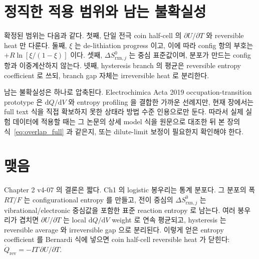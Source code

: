 \documentclass[11pt,a4paper]{article}
\newcommand{\dd}{\mathrm{d}}
\newcommand{\rxn}{\mathrm{rxn}}
\newcommand{\rev}{\mathrm{rev}}
\begin{document}
\section{정직한 적용 범위와 남는 불확실성}
\label{sec:scope}
확정된 범위는 다음과 같다. 첫째, 단일 전극 coin half-cell 의 $\partial U/\partial T$ 와
reversible heat 만 다룬다. 둘째, $\xi$ 는 de-lithiation progress 이고, 이에 따라 config 항의 부호는
$+R\ln[\xi/(1-\xi)]$ 이다. 셋째, $\Delta S_{\rxn,j}^0$ 는 중심 표준값이며, 분포가 만드는 config 항과
이중계산하지 않는다. 넷째, hysteresis branch 의 평균은 reversible entropy coefficient 로 쓰되,
branch gap 자체는 irreversible heat 로 분리한다.

남는 불확실성은 하나로 압축된다. Electrochimica Acta 2019 occupation-transition prototype 은
$\dd Q/\dd V$ 와 entropy profiling 을 결합한 가까운 선례지만, 현재 장에서는 full text 식을 직접 확보하지
못한 상태라 방법 수준 인용으로만 둔다. 따라서 실제 실험 데이터에 적용할 때는 그 논문의 상세 model 식을
원문으로 대조한 뒤 본 장의 식~\eqref{eq:overlap_full} 과 같은지, 또는 dilute-limit 보정이 필요한지
확인해야 한다.

\section*{맺음}
Chapter 2 v4-07 의 결론은 짧다. Ch1 의 logistic 봉우리는 통계 분포다. 그 분포의 폭 $RT/F$ 는
configurational entropy 를 만들고, 전이 중심의 $\Delta S_{\rxn,j}^0$ 는 vibrational/electronic 중심값을
포함한 표준 reaction entropy 로 남는다. 여러 봉우리가 겹치면 $\partial U/\partial T$ 는 local
$\dd Q/\dd V$ weight 로 연속 평균되고, hysteresis 는 reversible average 와 irreversible gap 으로 분리된다.
이렇게 얻은 entropy coefficient 를 Bernardi 식에 넣으면 coin half-cell reversible heat 가 닫힌다:
$\dot Q_\rev=-IT\,\partial U/\partial T$.
\end{document}
